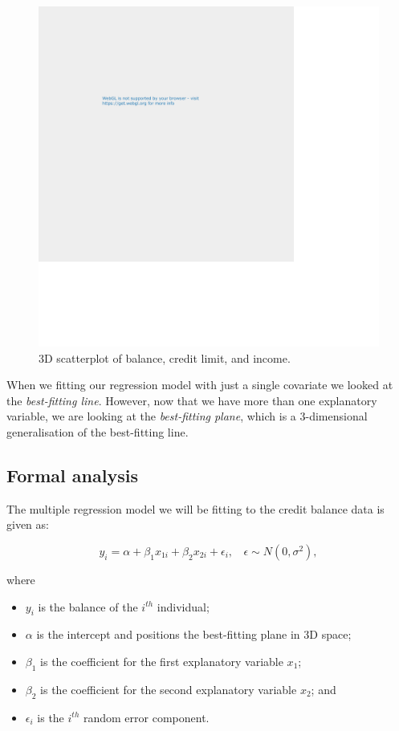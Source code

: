 \documentclass[
  letterpaper,
  DIV=11,
  numbers=noendperiod]{scrartcl}
\providecommand{\tightlist}{%
  \setlength{\itemsep}{0pt}\setlength{\parskip}{0pt}}\usepackage{longtable,booktabs,array}
\begin{document}
\begin{figure}[H]

{\centering \includegraphics{index_files/figure-pdf/unnamed-chunk-29-1.pdf}

}

\caption{3D scatterplot of balance, credit limit, and income.}

\end{figure}%

When we fitting our regression model with just a single covariate we
looked at the \emph{best-fitting line}. However, now that we have more
than one explanatory variable, we are looking at the \emph{best-fitting
plane}, which is a 3-dimensional generalisation of the best-fitting
line.

\subsection{Formal analysis}\label{formal-analysis-2}

The multiple regression model we will be fitting to the credit balance
data is given as:

\[y_i = \alpha + \beta_1 x_{1i} + \beta_2 x_{2i} + \epsilon_i, ~~~~ \epsilon \sim N(0, \sigma^2),\]

where

\begin{itemize}
\tightlist
\item
  \(y_i\) is the balance of the \(i^{th}\) individual;
\item
  \(\alpha\) is the intercept and positions the best-fitting plane in 3D
  space;
\item
  \(\beta_1\) is the coefficient for the first explanatory variable
  \(x_1\);
\item
  \(\beta_2\) is the coefficient for the second explanatory variable
  \(x_2\); and
\item
  \(\epsilon_i\) is the \(i^{th}\) random error component.
\end{itemize}
\end{document}
